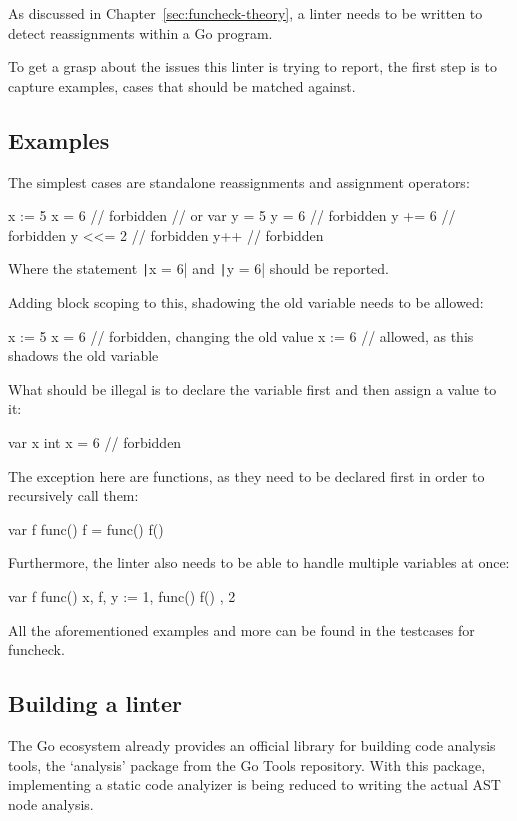 As discussed in Chapter~\ref{sec:funcheck-theory}, a linter needs to be written
to detect reassignments within a Go program.

To get a grasp about the issues this linter is trying to report, the first step
is to capture examples, cases that should be matched against.

\subsection{Examples}

The simplest cases are standalone reassignments and assignment operators:
\begin{gocode}
x := 5
x = 6 // forbidden
// or
var y = 5
y = 6   // forbidden
y += 6  // forbidden
y <<= 2 // forbidden
y++     // forbidden
\end{gocode}
Where the statement \texttt|x = 6| and \texttt|y = 6| should be reported.

Adding block scoping to this, shadowing the old variable needs to be allowed:
\begin{gocode}
x := 5
{
	x = 6  // forbidden, changing the old value
	x := 6 // allowed, as this shadows the old variable
}
\end{gocode}
What should be illegal is to declare the variable first and then assign a
value to it:
\begin{gocode}
var x int
x = 6 // forbidden
\end{gocode}
The exception here are functions, as they need to be declared first in order
to recursively call them:
\begin{gocode}
var f func()
f = func() {
	f()
}
\end{gocode}
Furthermore, the linter also needs to be able to handle multiple variables
at once:
\begin{gocode}
var f func()
x, f, y := 1, func() { f() }, 2
\end{gocode}

All the aforementioned examples and more can be found in the testcases for funcheck\autocite{funcheck-examples}.

\subsection{Building a linter}

The Go ecosystem already provides an official library for building code analysis tools,
the `analysis' package from the Go Tools repository\autocite{go-analysis}. With this package,
implementing a static code analyizer is being reduced to writing the actual AST node analysis.

